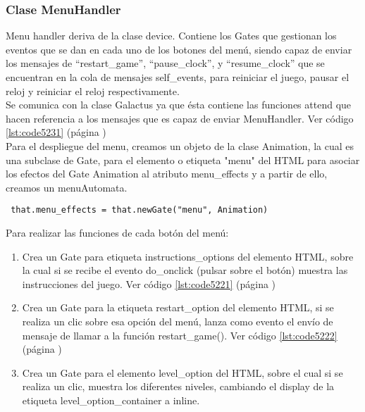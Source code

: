 \subsubsection{Clase MenuHandler}
\label{subsubsection:menu_handler}

Menu handler deriva de la clase device. Contiene los Gates que gestionan los eventos que se dan en cada uno de los botones 
del menú, siendo capaz de enviar los mensajes de “restart\_game”, “pause\_clock”, y “resume\_clock” que se encuentran en la 
cola de mensajes self\_events, para reiniciar el juego, pausar el reloj y reiniciar el reloj respectivamente.\\

Se comunica con la clase Galactus ya que ésta contiene las funciones attend que hacen referencia a los mensajes que es capaz 
de enviar MenuHandler. Ver código \ref{lst:code5231} (página \pageref{lst:code5231})\\

Para el despliegue del menu, creamos un objeto de la clase Animation, la cual es una subclase de Gate, para el elemento o etiqueta "menu" del HTML para 
asociar los efectos del Gate Animation al atributo menu\_effects y a partir de ello, creamos un menuAutomata.

\begin{verbatim}
 that.menu_effects = that.newGate("menu", Animation)
\end{verbatim}

Para realizar las funciones de cada botón del menú:

\begin{enumerate}
 \item Crea un Gate  para etiqueta instructions\_options del elemento HTML, sobre la cual si se recibe el 
evento do\_onclick (pulsar sobre el botón) muestra las instrucciones del juego. Ver código \ref{lst:code5221} (página \pageref{lst:code5221})

 \item Crea un Gate para la etiqueta restart\_option del elemento HTML, si se realiza un clic sobre esa opción del menú, lanza como evento el envío 
de mensaje de llamar a la función restart\_game(). Ver código \ref{lst:code5222} (página \pageref{lst:code5222})

 \item Crea un Gate para el elemento level\_option del HTML, sobre el cual si se realiza un clic,
muestra los diferentes niveles, cambiando el display de la etiqueta level\_option\_container a inline.
\end{enumerate}

